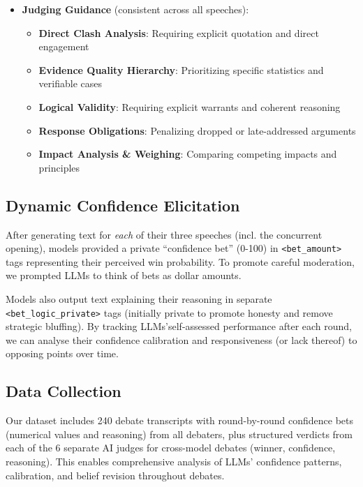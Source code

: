 \documentclass{article}
\begin{document}
\begin{itemize}
 \item \textbf{Judging Guidance} (consistent across all speeches):
 \begin{itemize}
   \item \textbf{Direct Clash Analysis}: Requiring explicit quotation and direct engagement
   \item \textbf{Evidence Quality Hierarchy}: Prioritizing specific statistics and verifiable cases
   \item \textbf{Logical Validity}: Requiring explicit warrants and coherent reasoning
   \item \textbf{Response Obligations}: Penalizing dropped or late-addressed arguments
   \item \textbf{Impact Analysis \& Weighing}: Comparing competing impacts and principles
 \end{itemize}
\end{itemize}

\subsection{Dynamic Confidence Elicitation}
\label{subsec:confidence_elicitation}

After generating text for \textit{each} of their three speeches (incl. the concurrent opening), models provided a private ``confidence bet'' (0-100) in \texttt{\textless bet\_amount\textgreater} tags representing their perceived win probability. To promote careful moderation, we prompted LLMs to think of bets as dollar amounts.

Models also output text explaining their reasoning in separate \texttt{\textless bet\_logic\_private\textgreater} tags (initially private to promote honesty and remove strategic bluffing). By tracking LLMs'self-assessed performance after each round, we can analyse their confidence calibration and responsiveness (or lack thereof) to opposing points over time.

\subsection{Data Collection}
\label{subsec:data_collection}
Our dataset includes 240 debate transcripts with round-by-round confidence bets (numerical values and reasoning) from all debaters, plus structured verdicts from each of the 6 separate AI judges for cross-model debates (winner, confidence, reasoning). This enables comprehensive analysis of LLMs' confidence patterns, calibration, and belief revision throughout debates.
\end{document}
